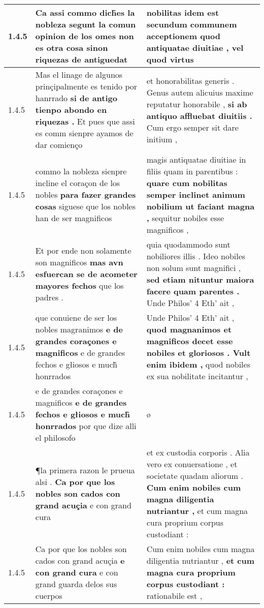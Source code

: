 \begin{tabular}{|p{1cm}|p{6.5cm}|p{6.5cm}|}
1.4.5 & Ca assi commo dich̃es la nobleza \textbf{ segunt la comun opinion de los omes } non es otra cosa sinon riquezas de antiguedat & nobilitas idem est \textbf{ secundum communem acceptionem quod antiquatae diuitiae , } vel quod virtus \\\hline
1.4.5 & Mas el linage de algunos prinçipalmente es tenido por hanrrado \textbf{ si de antigo tienpo abondo en riquezas . } Et pues que assi es comm sienpre ayamos de dar comienço & et honorabilitas generis . Genus autem alicuius maxime reputatur honorabile , \textbf{ si ab antiquo affluebat diuitiis . } Cum ergo semper sit dare initium , \\\hline
1.4.5 & commo la nobleza sienpre incline el coraçon de los nobles \textbf{ para fazer grandes cosas } siguese que los nobles han de ser magnificos & magis antiquatae diuitiae in filiis quam in parentibus : \textbf{ quare cum nobilitas semper inclinet animum nobilium ut faciant magna , } sequitur nobiles esse magnificos , \\\hline
1.4.5 & Et por ende non solamente son magnificos \textbf{ mas avn esfuercan se de acometer mayores fechos } que los padres . & quia quodammodo sunt nobiliores illis . Ideo nobiles non solum sunt magnifici , \textbf{ sed etiam nituntur maiora facere quam parentes . } Unde Philos’ 4 Eth’ ait , \\\hline
1.4.5 & que conuiene de ser los nobles magranimos \textbf{ e de grandes coraçones e magnificos } e de grandes fechos e głiosos e much̃ honrrados & Unde Philos’ 4 Eth’ ait , \textbf{ quod magnanimos et magnificos decet esse nobiles et gloriosos . Vult enim ibidem , } quod nobiles ex sua nobilitate incitantur , \\\hline
1.4.5 & e de grandes coraçones e magnificos \textbf{ e de grandes fechos e głiosos e much̃ honrrados } por que dize alli el philosofo & ø \\\hline
1.4.5 & ¶la primera razon le prueua alsi . \textbf{ Ca por que los nobles son cados con grand acuçia } e con grand cura & et ex custodia corporis . Alia vero ex conuersatione , et societate quadam aliorum . \textbf{ Cum enim nobiles cum magna diligentia nutriantur , } et cum magna cura proprium corpus custodiant : \\\hline
1.4.5 & Ca por que los nobles son cados con grand acuçia \textbf{ e con grand cura } e con grand guarda delos sus cuerpos & Cum enim nobiles cum magna diligentia nutriantur , \textbf{ et cum magna cura proprium corpus custodiant : } rationabile est , \\\hline

\end{tabular}
